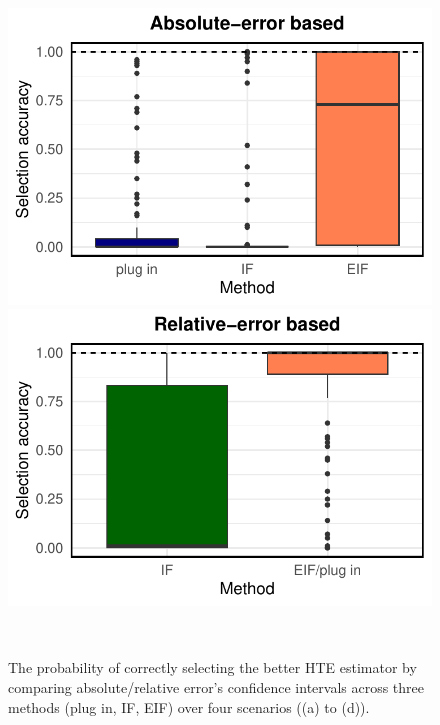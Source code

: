 \documentclass[twoside]{article}
\newcommand{\1}{{\mathbbm{1}}}
\begin{document}
\begin{figure}[ht]
\begin{minipage}{0.23\textwidth}
                \includegraphics[clip, trim = 0cm 0cm 0cm 0cm, width = \textwidth]{plot/ACIC_nonlinear_propensity_nonlinear_HTE_selection_accuracy_absolute_error.pdf}
        \end{minipage}
            \begin{minipage}{0.23\textwidth}
                \centering
                \includegraphics[clip, trim = 0cm 0cm 0cm 0cm, width = \textwidth]{plot/ACIC_nonlinear_propensity_nonlinear_HTE_selection_accuracy_relative_error.pdf}
        \end{minipage}
         \\
        \caption{
        \small The probability of correctly selecting the better HTE estimator by comparing absolute/relative error's confidence intervals across three methods (plug in, IF, EIF) over four scenarios ((a) to (d)).   
        }
    \label{fig:ACIC.selection.accuracy}
\end{figure}
\end{document}
